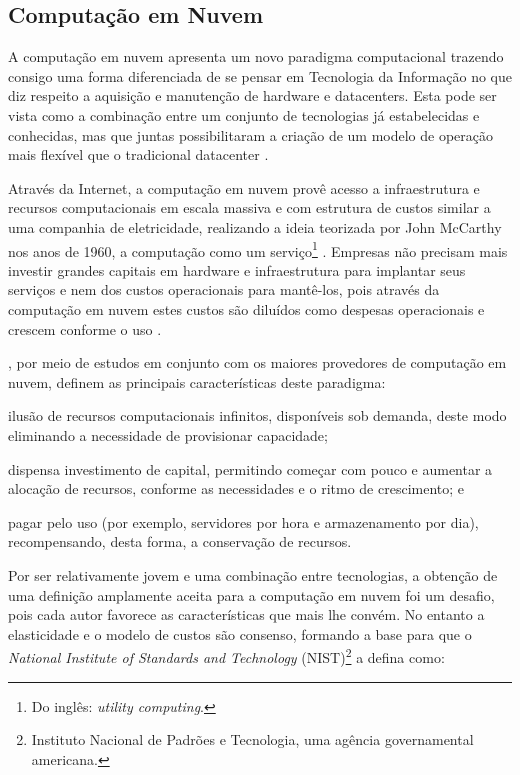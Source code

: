 \documentclass[english,brazilian]{UNISINOSmonografia} %
\begin{document}
\subsection{Computação em Nuvem}
\label{sec:cloud}


A computação em nuvem apresenta um novo paradigma computacional trazendo consigo uma forma diferenciada de se pensar em Tecnologia da Informação no que diz respeito a aquisição e manutenção de hardware e datacenters. 
Esta pode ser vista como a combinação entre um conjunto de tecnologias já estabelecidas e conhecidas, mas que juntas possibilitaram a criação de um modelo de operação mais flexível que o tradicional datacenter \cite{Zhang2010}.

Através da Internet, a computação em nuvem provê acesso a infraestrutura e recursos computacionais em escala massiva e com estrutura de custos similar a uma companhia de eletricidade, realizando a ideia teorizada por John McCarthy nos anos de 1960, a computação como um serviço\footnote{
	Do inglês: \textit{utility computing}.
}
\cite{Zhang2010,Suleiman2012}.
Empresas não precisam mais investir grandes capitais em hardware e infraestrutura para implantar seus serviços e nem dos custos operacionais para mantê-los, pois através da computação em nuvem estes custos são diluídos como despesas operacionais e crescem conforme o uso \cite{Martin2011}.

, por meio de estudos em conjunto com os maiores provedores de computação em nuvem, definem as principais características deste paradigma:
\begin{inparaenum}
	\item ilusão de recursos computacionais infinitos, disponíveis sob demanda, deste modo eliminando a necessidade de provisionar capacidade;
	\item dispensa investimento de capital, permitindo começar com pouco e aumentar a alocação de recursos, conforme as necessidades e o ritmo de crescimento; e
	\item pagar pelo uso (por exemplo, servidores por hora e armazenamento por dia), recompensando, desta forma, a conservação de recursos.
\end{inparaenum}



Por ser relativamente jovem e uma combinação entre tecnologias, a obtenção de uma definição amplamente aceita para a computação em nuvem foi um desafio, pois cada autor favorece as características que mais lhe convém.
No entanto a elasticidade e o modelo de custos são consenso, formando a base para que o \textit{National Institute of Standards and Technology} (NIST)\footnote{
	Instituto Nacional de Padrões e Tecnologia, uma agência governamental americana.
} a defina como:
\end{document}
